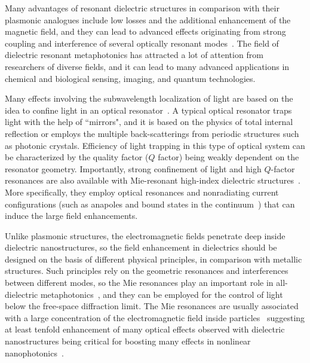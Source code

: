 \documentclass[journal=chreay,manuscript=review]{achemso}
\begin{document}
Many advantages of resonant dielectric structures in comparison with their plasmonic analogues include low losses and the additional enhancement of the magnetic field, and they can lead to advanced effects originating from strong coupling and interference of several optically resonant modes~\cite{Koshelev_2021}. The field of dielectric resonant metaphotonics has attracted a lot of attention from researchers of diverse fields, and it can lead to many advanced applications in chemical and biological sensing, imaging, and quantum technologies. 

Many effects involving the subwavelength localization of light are based on the idea to confine light in an optical resonator~\cite{vahala_2003}. A typical optical resonator traps light with the help of “mirrors", and it is based on the physics of total internal reflection or employs the multiple back-scatterings from periodic structures such as photonic crystals. Efficiency of light trapping in this type of optical system can be characterized by the quality factor ($Q$ factor) being weakly dependent on the resonator geometry. Importantly, strong confinement of light and high $Q$-factor resonances are also available with Mie-resonant high-index dielectric structures~\cite{Koshelev_2021}. More specifically, they employ optical resonances and nonradiating current configurations (such as anapoles and bound states in the continuum~\cite{BIC_2019}) that can induce the large field enhancements.

Unlike plasmonic structures, the electromagnetic fields penetrate deep inside dielectric nanostructures, so the field enhancement in dielectrics should be designed on the basis of different physical principles, in comparison with metallic structures. Such principles rely on the geometric resonances and interferences between different modes, so the Mie resonances play an important role in all-dielectric metaphotonics~\cite{kuznetsov2016optically,staude2017metamaterial,kruk2017functional}, and they can be employed for the control of light below the free-space diffraction limit. The Mie resonances are usually associated with a large concentration of the electromagnetic field inside particles~\cite{kapitanova2017giant} suggesting at least tenfold enhancement of many optical effects observed with dielectric nanostructures being critical for boosting many effects in nonlinear nanophotonics~\cite{shcherbakov2014enhanced,makarov2015tuning,shcherbakov2017ultrafast,cambiasso2017bridging,zhang2018lighting,marino2019zero,zograf2020stimulated,zograf2022high}.
\end{document}
